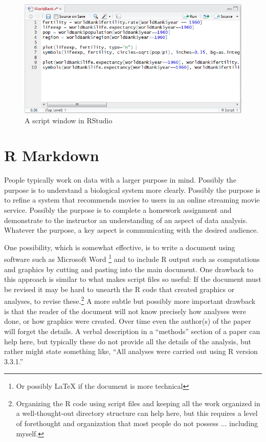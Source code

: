 \documentclass[]{krantz}
\begin{document}
\begin{figure}
\includegraphics[width=1\linewidth]{../figures/ScriptWindow} \caption{A script window in RStudio}\label{fig:script}
\end{figure}

\section{R Markdown}\label{r-markdown}

People typically work on data with a larger purpose in mind. Possibly
the purpose is to understand a biological system more clearly. Possibly
the purpose is to refine a system that recommends movies to users in an
online streaming movie service. Possibly the purpose is to complete a
homework assignment and demonstrate to the instructor an understanding
of an aspect of data analysis. Whatever the purpose, a key aspect is
communicating with the desired audience.

One possibility, which is somewhat effective, is to write a document
using software such as Microsoft Word \footnote{Or possibly LaTeX if the
  document is more technical} and to include R output such as
computations and graphics by cutting and pasting into the main document.
One drawback to this approach is similar to what makes script files so
useful: If the document must be revised it may be hard to unearth the R
code that created graphics or analyses, to revise these.\footnote{Organizing
  the R code using script files and keeping all the work organized in a
  well-thought-out directory structure can help here, but this requires
  a level of forethought and organization that most people do not
  possess \(\ldots\) including myself.} A more subtle but possibly more
important drawback is that the reader of the document will not know
precisely how analyses were done, or how graphics were created. Over
time even the author(s) of the paper will forget the details. A verbal
description in a ``methods'' section of a paper can help here, but
typically these do not provide all the details of the analysis, but
rather might state something like, ``All analyses were carried out using
R version 3.3.1.''
\end{document}
